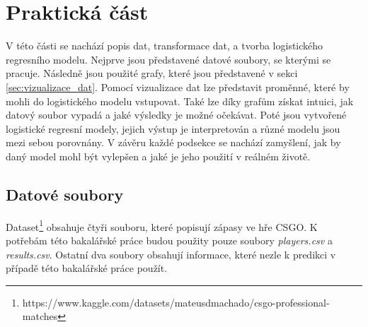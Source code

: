 \chapter{Praktická část}

{\color{red}
V této části se nachází popis dat, transformace dat, a tvorba logistického regresního modelu. Nejprve jsou představené datové soubory,
se kterými se pracuje. Následně jsou použité grafy, které jsou představené v sekci \ref{sec:vizualizace_dat}. Pomocí vizualizace dat lze představit proměnné, které
by mohli do logistického modelu vstupovat. Také lze díky grafům získat intuici, jak datový soubor vypadá a jaké výsledky je možné očekávat.
Poté jsou vytvořené logistické regresní modely, jejich výstup je interpretován a různé modelu jsou mezi sebou porovnány. V závěru každé podsekce
se nachází zamyšlení, jak by daný model mohl být vylepšen a jaké je jeho použití v reálném životě.
}

{\color{red}
\section{Datové soubory}
Dataset\footnote{https://www.kaggle.com/datasets/mateusdmachado/csgo-professional-matches} obsahuje čtyři souboru, které popisují zápasy ve hře
\ac{CSGO}. K potřebám této bakalářské práce budou použity pouze soubory \textit{players.csv} a \textit{results.csv}. Ostatní dva soubory obsahují
informace, které nezle k predikci v případě této bakalářské práce použít.
}

